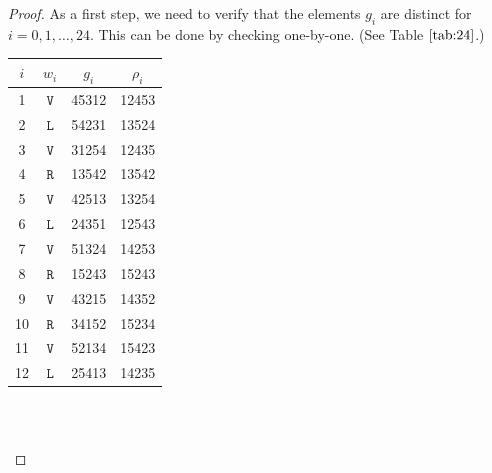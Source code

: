 \documentclass[lualatex,11pt]{article}
\begin{document}
\begin{proof}
 As a first step, we need to verify that the elements $g_{i}$ are distinct for $i=0,1,\ldots,24$.
 This can be done by checking one-by-one. (See Table $\ref{tab:24}$.)
\begin{center}
 \begin{table}[H]
  \begin{center}
\begin{tabular}{c|c|c|c}
$i$ & $w_i$ & $g_i$ &  $\rho_i$ \\
 \hline
1  &   $\mathtt{V}$ &  45312 & 12453 \\
2  &   $\mathtt{L}$ &  54231 & 13524 \\
3  &   $\mathtt{V}$ &  31254 & 12435 \\
4  &   $\mathtt{R}$ &  13542 & 13542 \\
5  &   $\mathtt{V}$ &  42513 & 13254 \\
6  &   $\mathtt{L}$ &  24351 & 12543 \\
7  &   $\mathtt{V}$ &  51324 & 14253 \\
8  &   $\mathtt{R}$ &  15243 & 15243 \\
9  &   $\mathtt{V}$ &  43215 & 14352 \\
10 &   $\mathtt{R}$ &  34152 & 15234 \\
11 &   $\mathtt{V}$ &  52134 & 15423 \\
12 &   $\mathtt{L}$ &  25413 & 14235 \\
\end{tabular}
~~
\begin{tabular}{c|c|c|c}

\end{tabular}
\end{center}
\end{table}
\end{center}
\end{proof}
\end{document}
